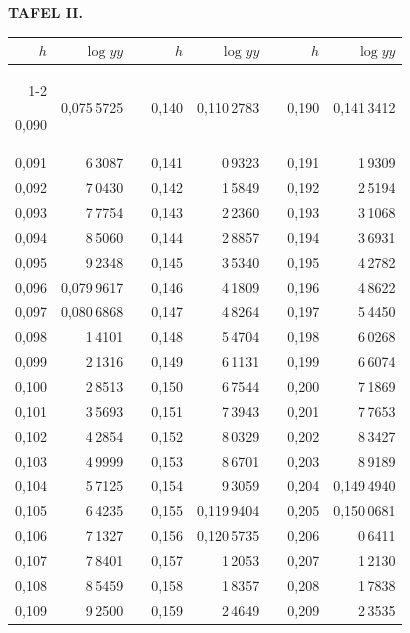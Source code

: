 \endgroup
\clearpage
{}
\begingroup
\centering
\fontsize{9}{9}\selectfont
\setlength{\tabcolsep}{8pt}
\renewcommand{\arraystretch}{1}
\setlength{\parskip}{0pt}
\textbf{TAFEL II.}
\par\vspace{7pt}
\begin{tabular}{|r|r|@{}p{9pt}@{}|r|r|@{}p{9pt}@{}|r|r|}
\hline
\rule{0pt}{8.5pt}\(h\) & \(\log yy\) & & \(h\) & \(\log yy\) & & \(h\) & \(\log yy\) \\
\cline{1-2}\cline{4-5}\cline{7-8}
\rule{0pt}{8.5pt}0,090 & 0,075\,5725 &  & 0,140 & 0,110\,2783 &  & 0,190 & 0,141\,3412 \\
0,091 & 6\,3087 &  & 0,141 & 0\,9323 &  & 0,191 & 1\,9309 \\
0,092 & 7\,0430 &  & 0,142 & 1\,5849 &  & 0,192 & 2\,5194 \\
0,093 & 7\,7754 &  & 0,143 & 2\,2360 &  & 0,193 & 3\,1068 \\
0,094 & 8\,5060 &  & 0,144 & 2\,8857 &  & 0,194 & 3\,6931 \\
0,095 & 9\,2348 &  & 0,145 & 3\,5340 &  & 0,195 & 4\,2782 \\[3pt]
0,096 & 0,079\,9617 &  & 0,146 & 4\,1809 &  & 0,196 & 4\,8622 \\
0,097 & 0,080\,6868 &  & 0,147 & 4\,8264 &  & 0,197 & 5\,4450 \\
0,098 & 1\,4101 &  & 0,148 & 5\,4704 &  & 0,198 & 6\,0268 \\
0,099 & 2\,1316 &  & 0,149 & 6\,1131 &  & 0,199 & 6\,6074 \\
0,100 & 2\,8513 &  & 0,150 & 6\,7544 &  & 0,200 & 7\,1869 \\[3pt]
0,101 & 3\,5693 &  & 0,151 & 7\,3943 &  & 0,201 & 7\,7653 \\
0,102 & 4\,2854 &  & 0,152 & 8\,0329 &  & 0,202 & 8\,3427 \\
0,103 & 4\,9999 &  & 0,153 & 8\,6701 &  & 0,203 & 8\,9189 \\
0,104 & 5\,7125 &  & 0,154 & 9\,3059 &  & 0,204 & 0,149\,4940 \\
0,105 & 6\,4235 &  & 0,155 & 0,119\,9404 &  & 0,205 & 0,150\,0681 \\[3pt]
0,106 & 7\,1327 &  & 0,156 & 0,120\,5735 &  & 0,206 & 0\,6411 \\
0,107 & 7\,8401 &  & 0,157 & 1\,2053 &  & 0,207 & 1\,2130 \\
0,108 & 8\,5459 &  & 0,158 & 1\,8357 &  & 0,208 & 1\,7838 \\
0,109 & 9\,2500 &  & 0,159 & 2\,4649 &  & 0,209 & 2\,3535 \\

\end{tabular}
